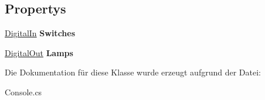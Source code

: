 \subsection*{Propertys}
\begin{DoxyCompactItemize}
\item 
\hypertarget{class_robot_ctrl_1_1_console_a6bda1a70d35ecd46bdf21be13745932c}{
\hyperlink{class_robot_ctrl_1_1_digital_in}{DigitalIn} {\bfseries Switches}}
\label{class_robot_ctrl_1_1_console_a6bda1a70d35ecd46bdf21be13745932c}

\item 
\hypertarget{class_robot_ctrl_1_1_console_a8d77cea764f4a4e2c4692e5776b7ded8}{
\hyperlink{class_robot_ctrl_1_1_digital_out}{DigitalOut} {\bfseries Lamps}}
\label{class_robot_ctrl_1_1_console_a8d77cea764f4a4e2c4692e5776b7ded8}

\end{DoxyCompactItemize}


Die Dokumentation für diese Klasse wurde erzeugt aufgrund der Datei:\begin{DoxyCompactItemize}
\item 
Console.cs\end{DoxyCompactItemize}
